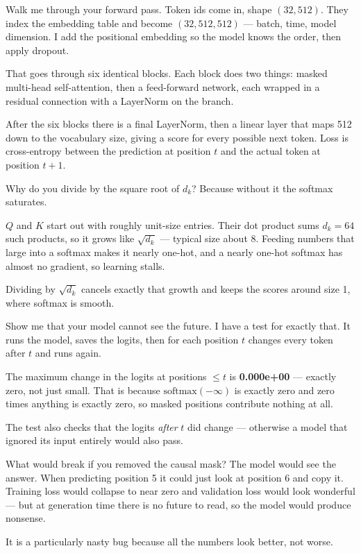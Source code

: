 \documentclass[11pt]{report}
\begin{document}
\begin{qabox}{Walk me through your forward pass.}
Token ids come in, shape $(32, 512)$. They index the embedding table and become
$(32, 512, 512)$ --- batch, time, model dimension. I add the positional embedding
so the model knows the order, then apply dropout.

That goes through six identical blocks. Each block does two things: masked
multi-head self-attention, then a feed-forward network, each wrapped in a residual
connection with a LayerNorm on the branch.

After the six blocks there is a final LayerNorm, then a linear layer that maps 512
down to the vocabulary size, giving a score for every possible next token. Loss is
cross-entropy between the prediction at position $t$ and the actual token at
position $t{+}1$.
\end{qabox}

\begin{qabox}{Why do you divide by the square root of $d_k$?}
Because without it the softmax saturates.

$Q$ and $K$ start out with roughly unit-size entries. Their dot product sums
$d_k = 64$ such products, so it grows like $\sqrt{d_k}$ --- typical size about 8.
Feeding numbers that large into a softmax makes it nearly one-hot, and a nearly
one-hot softmax has almost no gradient, so learning stalls.

Dividing by $\sqrt{d_k}$ cancels exactly that growth and keeps the scores around
size 1, where softmax is smooth.
\end{qabox}

\begin{qabox}{Show me that your model cannot see the future.}
I have a test for exactly that. It runs the model, saves the logits, then for each
position $t$ changes every token after $t$ and runs again.

The maximum change in the logits at positions $\le t$ is \textbf{0.000e+00} ---
exactly zero, not just small. That is because $\text{softmax}(-\infty)$ is exactly
zero and zero times anything is exactly zero, so masked positions contribute
nothing at all.

The test also checks that the logits \emph{after} $t$ did change --- otherwise a
model that ignored its input entirely would also pass.
\end{qabox}

\begin{qabox}{What would break if you removed the causal mask?}
The model would see the answer. When predicting position 5 it could just look at
position 6 and copy it. Training loss would collapse to near zero and validation
loss would look wonderful --- but at generation time there is no future to read,
so the model would produce nonsense.

It is a particularly nasty bug because all the numbers look better, not worse.
\end{qabox}
\end{document}
